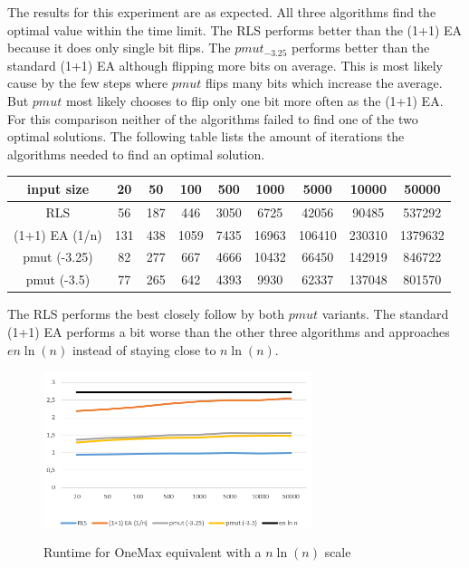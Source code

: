 The results for this experiment are as expected.
All three algorithms find the optimal value within the time limit.
The RLS performs better than the (1+1) EA because it does only single bit flips.
The $pmut_{-3.25}$ performs better than the standard (1+1) EA although flipping more bits on average.
This is most likely cause by the few steps where $pmut$ flips many bits which increase the average.
But $pmut$ most likely chooses to flip only one bit more often as the (1+1) EA.\newline
For this comparison neither of the algorithms failed to find one of the two optimal solutions.
The following table lists the amount of iterations the algorithms needed to find an optimal solution.

\begin{tabular}[h]{ccccccccc}
      input size     & 20  & 50  & 100  & 500  & 1000  & 5000   & 10000  & 50000   \\\hline
      RLS            & 56  & 187 & 446  & 3050 & 6725  & 42056  & 90485  & 537292  \\
      (1+1) EA (1/n) & 131 & 438 & 1059 & 7435 & 16963 & 106410 & 230310 & 1379632 \\
      pmut (-3.25)   & 82  & 277 & 667  & 4666 & 10432 & 66450  & 142919 & 846722  \\
      pmut (-3.5)    & 77  & 265 & 642  & 4393 & 9930  & 62337  & 137048 & 801570  \\
\end{tabular}

The RLS performs the best closely follow by both $pmut$ variants.
The standard (1+1) EA performs a bit worse than the other three algorithms and approaches $en\ln(n)$ instead of staying close to $n\ln(n)$.

\begin{figure}[h]
      \caption{Runtime for OneMax equivalent with a $n\ln(n)$ scale}
      \centering
      \includegraphics[width=0.7\textwidth]{figures/images/oneMaxMultipleN.png}\label{fig:onemaxNlogNBound}
\end{figure}
